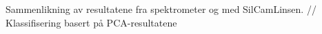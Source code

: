 Sammenlikning av resultatene fra spektrometer og med SilCamLinsen. 
//
Klassifisering basert på PCA-resultatene